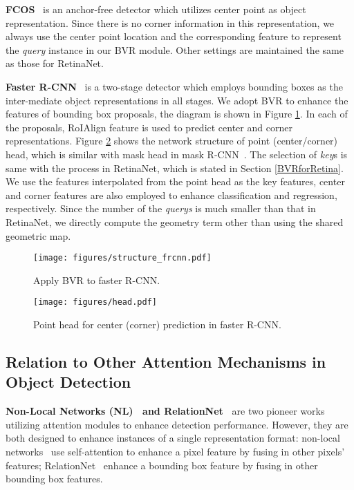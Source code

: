 \documentclass{article}
\begin{document}
{\noindent \textbf{FCOS}}~\cite{FCOS} is an anchor-free detector which utilizes center point as object representation. Since there is no corner information in this representation, we always use the center point location and the corresponding feature to represent the \emph{query} instance in our BVR module. Other settings are maintained the same as those for RetinaNet.

{\noindent \textbf{Faster R-CNN}}~\cite{ren2015faster} is a two-stage detector which employs bounding boxes as the inter-mediate object representations in all stages. We adopt BVR to enhance the features of bounding box proposals, the diagram is shown in Figure \ref{fig:frcnn}. In each of the proposals, RoIAlign feature is used to predict center and corner representations. Figure \ref{fig:head} shows the network structure of point (center/corner) head, which is similar with mask head in mask R-CNN~\cite{Mask-rcnn}. The selection of \emph{key}s is same with the process in RetinaNet, which is stated in Section \ref{BVRforRetina}. We use the features interpolated from the point head as the key features, center and corner features are also employed to enhance classification and regression, respectively. Since the number of the \emph{querys} is much smaller than that in RetinaNet, we directly compute the geometry term other than using the shared geometric map. 


\begin{figure*}[t]
\begin{subfigure}{.6\textwidth}
  \centering
\texttt{[image: figures/structure\_frcnn.pdf]}  
  \caption{Apply BVR to faster R-CNN.}
  \label{fig:frcnn}
\end{subfigure}
\begin{subfigure}{.35\textwidth}
  \centering
\texttt{[image: figures/head.pdf]}
  \caption{Point head for center (corner) prediction in faster R-CNN.}
  \label{fig:head}
\end{subfigure}
\caption{Design of applying BVR to faster R-CNN.}
\vspace{-1em}
\end{figure*}

\subsection{Relation to Other Attention Mechanisms in Object Detection}

{\noindent \textbf{Non-Local Networks (NL)~\cite{DBLP:conf/cvpr/0004GGH18} and RelationNet~\cite{hu2018relation}}} are two pioneer works utilizing attention modules to enhance detection performance. However, they are both designed to enhance instances of a single representation format: non-local networks~\cite{DBLP:conf/cvpr/0004GGH18} use self-attention to enhance a pixel feature by fusing in other pixels' features; RelationNet~\cite{hu2018relation} enhance a bounding box feature by fusing in other bounding box features.
\end{document}
